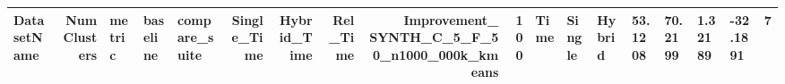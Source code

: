 \begin{tabular}{lrlllrrrrr}
\toprule
DatasetName & NumClusters & metric & baseline & compare_suite & Single_Time & Hybrid_Time & Rel_Time & Improvement_%
\midrule
SYNTH_C_5_F_50_n1000_000k_kmeans & 100 & Time & Single & Hybrid & 53.1208 & 70.2199 & 1.32189 & -32.1891 & 7 \\
\bottomrule
\end{tabular}
